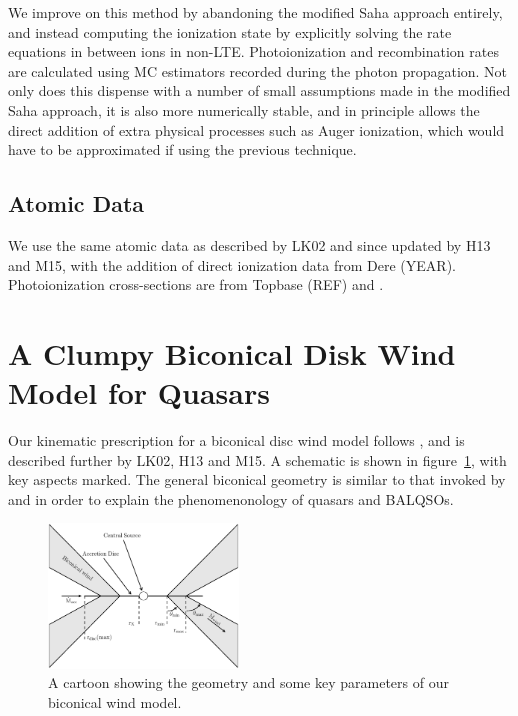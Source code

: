 \documentclass[useAMS,usenatbib]{mn2e_x}
\begin{document}
We improve on this method by abandoning the modified Saha approach
entirely, and instead computing the ionization state by 
explicitly solving the rate equations in between ions in non-LTE. 
Photoionization and recombination rates are calculated using MC estimators recorded
during the photon propagation. Not only does this dispense with a number of
small assumptions made in the modified Saha approach, it is also more numerically stable, 
and in principle allows the direct addition of extra physical processes such as Auger ionization, which would have to be approximated if using the previous technique.

\subsection{Atomic Data}

We use the same atomic data as described by LK02 and since
updated by H13 and M15, with the addition of direct ionization data from Dere (YEAR). 
Photoionization cross-sections are from Topbase (REF) and  \cite{vfky}.





\bigskip
\bigskip
\bigskip

\section{A Clumpy Biconical Disk Wind Model for Quasars}

Our kinematic prescription for a biconical disc wind model
follows \cite{SV93}, and is described further by
LK02, H13 and M15. A schematic is shown in figure~\ref{fig:cartoon},
with key aspects marked. The general biconical
geometry is similar to that invoked by \cite{MCGV95} and 
\cite{elvis2000} in order to explain the phenomenonology
of quasars and BALQSOs.


\begin{figure} 
\centering
\includegraphics[width=0.45\textwidth]{figures/fig2_cartoon.eps}
\caption
{
A cartoon showing the geometry and some key parameters of
our biconical wind model.
}
\label{fig:cartoon}
\end{figure} 
\end{document}
